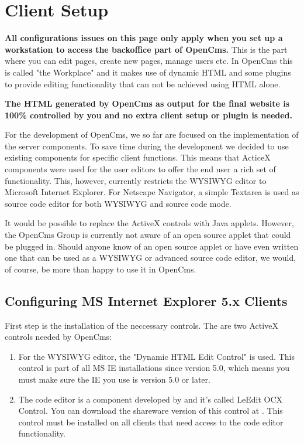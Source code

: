 \section{Client Setup}

\textbf{All configurations issues on this page only apply when you
set up a workstation to access the backoffice part of OpenCms.}
This is the part where you can edit pages, create new pages,
manage users etc. In OpenCms this is called "the Workplace" and it
makes use of dynamic HTML and some plugins to provide editing
functionality that can not be achieved using HTML alone.

\textbf{The HTML generated by OpenCms as output for the final
website is 100\% controlled by you and no extra client setup or
plugin is needed.}

For the development of OpenCms, we so far are focused on the
implementation of the server components. To save time during the
development we decided to use existing components for specific
client functions. This means that ActiceX components were used for
the user editors to offer the end user a rich set of
functionality. This, however, currently restricts the WYSIWYG
editor to Microsoft Internet Explorer. For Netscape Navigator, a
simple Textarea is used as source code editor for both WYSIWYG and
source code mode.

It would be possible to replace the ActiveX controls with Java
applets. However, the OpenCms Group is currently not aware of an
open source applet that could be plugged in. Should anyone know of
an open source applet or have even written one that can be used as
a WYSIWYG or advanced source code editor, we would, of course, be
more than happy to use it in OpenCms.


\subsection{Configuring MS Internet Explorer 5.x Clients}

First step is the installation of the neccessary controls. The are
two ActiveX controls needed by OpenCms:

\begin{enumerate}
\item For the WYSIWYG editor, the "Dynamic HTML Edit Control" is
used. This control is part of all MS IE installations since
version 5.0, which means you must make sure the IE you use is
version 5.0 or later.
\item The code editor is a component developed by  and it's
called LeEdit OCX Control. You can download the shareware version
of this control at
.
This control must be installed on all clients that need access to
the code editor functionality.
\end{enumerate}

